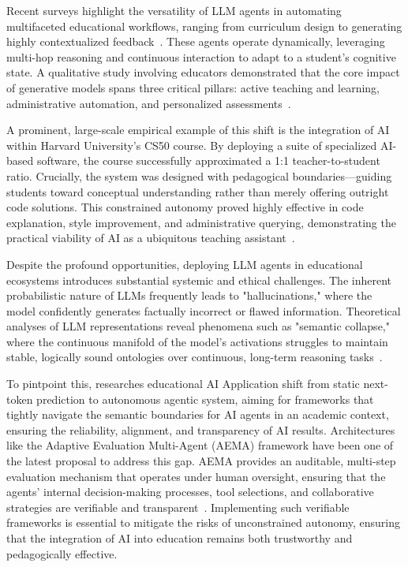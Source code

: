 Recent surveys highlight the versatility of LLM agents in automating multifaceted educational workflows, ranging from curriculum design to generating highly contextualized 
feedback~\cite{llm_in_edu}. These agents operate dynamically, leveraging multi-hop reasoning and continuous interaction to adapt to a student's cognitive state. A qualitative study involving educators demonstrated that the core impact of generative models spans three critical pillars: active teaching and learning, administrative automation, and personalized assessments~\cite{AI_in_Edu}. 

A prominent, large-scale empirical example of this shift is the integration of AI within Harvard University's CS50 course. By deploying a suite of specialized 
AI-based software, the course successfully approximated a 1:1 teacher-to-student ratio. Crucially, the system was designed with pedagogical boundaries—guiding 
students toward conceptual understanding rather than merely offering outright code solutions. This constrained autonomy proved highly effective in code explanation, 
style improvement, and administrative querying, demonstrating the practical viability of AI as a ubiquitous teaching assistant~\cite{ai_4_CS50}.

Despite the profound opportunities, deploying LLM agents in educational ecosystems introduces substantial systemic and ethical challenges. The inherent probabilistic 
nature of LLMs frequently leads to "hallucinations," where the model confidently generates factually incorrect or flawed information. Theoretical analyses of LLM representations reveal phenomena such as 
"semantic collapse," where the continuous manifold of the model's activations struggles to maintain stable, logically sound ontologies over continuous, long-term 
reasoning tasks~\cite{semantic_collapse}. 

To pintpoint this, researches educational AI Application shift from static next-token prediction to autonomous agentic system,
aiming for frameworks that tightly navigate the semantic boundaries for AI agents in an academic context,
ensuring the reliability, alignment, and transparency of AI results. Architectures like the Adaptive Evaluation Multi-Agent (AEMA) framework have been 
one of the latest proposal to address this gap. AEMA provides an auditable, multi-step evaluation mechanism that operates under human oversight, ensuring that the agents' internal 
decision-making processes, tool selections, and collaborative strategies are verifiable and transparent~\cite{AEMA_agentic_eval}. Implementing such verifiable 
frameworks is essential to mitigate the risks of unconstrained autonomy, ensuring that the integration of AI into education remains both trustworthy and pedagogically effective.

